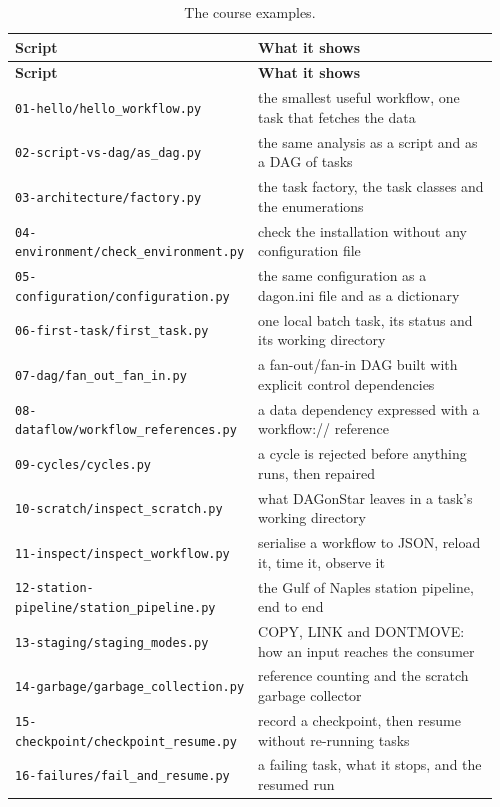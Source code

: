 {\small
\begin{longtable}{@{}p{0.43\linewidth}p{0.53\linewidth}@{}}
\caption{The course examples.}\label{tab:course-examples}\\
\toprule
\textbf{Script} & \textbf{What it shows} \\
\midrule
\endfirsthead
\toprule
\textbf{Script} & \textbf{What it shows} \\
\midrule
\endhead
\texttt{01-hello/hello\_workflow.py} & the smallest useful workflow, one task that fetches the data \\
\texttt{02-script-vs-dag/as\_dag.py} & the same analysis as a script and as a DAG of tasks \\
\texttt{03-architecture/factory.py} & the task factory, the task classes and the enumerations \\
\texttt{04-environment/check\_environment.py} & check the installation without any configuration file \\
\texttt{05-configuration/configuration.py} & the same configuration as a dagon.ini file and as a dictionary \\
\texttt{06-first-task/first\_task.py} & one local batch task, its status and its working directory \\
\texttt{07-dag/fan\_out\_fan\_in.py} & a fan-out/fan-in DAG built with explicit control dependencies \\
\texttt{08-dataflow/workflow\_references.py} & a data dependency expressed with a workflow:// reference \\
\texttt{09-cycles/cycles.py} & a cycle is rejected before anything runs, then repaired \\
\texttt{10-scratch/inspect\_scratch.py} & what DAGonStar leaves in a task's working directory \\
\texttt{11-inspect/inspect\_workflow.py} & serialise a workflow to JSON, reload it, time it, observe it \\
\texttt{12-station-pipeline/station\_pipeline.py} & the Gulf of Naples station pipeline, end to end \\
\texttt{13-staging/staging\_modes.py} & COPY, LINK and DONTMOVE: how an input reaches the consumer \\
\texttt{14-garbage/garbage\_collection.py} & reference counting and the scratch garbage collector \\
\texttt{15-checkpoint/checkpoint\_resume.py} & record a checkpoint, then resume without re-running tasks \\
\texttt{16-failures/fail\_and\_resume.py} & a failing task, what it stops, and the resumed run \\

\end{longtable}}
